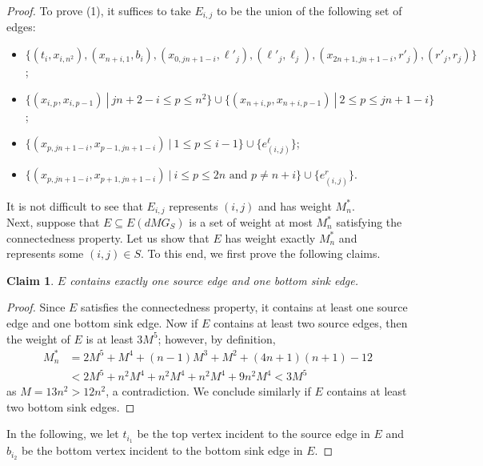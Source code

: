 \documentclass[a4paper,11pt]{article}
\theoremstyle{plain}
\newtheorem{claim}[theorem]{Claim}
\newtheorem{identification rule}{Identification Rule}
\theoremstyle{definition}
\theoremstyle{remark}
\newenvironment{claimproof}{\begin{proof}\renewcommand{\qedsymbol}{\claimqed}}{\end{proof}\renewcommand{\qedsymbol}{\plainqed}}
\let\plainqed\qedsymbol
\newcommand{\claimqed}{$\lrcorner$}
\begin{document}
\begin{proof}
To prove (1), it suffices to take $E_{i,j}$ to be the union of the following set of edges:
\begin{itemize}
\item $\{(t_i,x_{i,n^2}),(x_{n+i,1},b_i),(x_{0,jn+1-i},\ell'_j),(\ell'_j,\ell_j),(x_{2n+1,jn+1-i},r'_j),(r'_j,r_j)\}$;
\item $\{(x_{i,p},x_{i,p-1})~|~ jn+2-i\leq p \leq n^2\} \cup \{(x_{n+i,p},x_{n+i,p-1})~|~2 \leq p \leq jn+1-i\}$;
\item $\{(x_{p,jn+1-i},x_{p-1,jn+1-i})~|~ 1 \leq p \leq i-1\} \cup \{e^\ell_{(i,j)}\}$;
\item $\{(x_{p,jn+1-i},x_{p+1,jn+1-i})~|~i \leq p \leq 2n \text { and } p \neq n+i\} \cup \{e^r_{(i,j)}\}$.
\end{itemize}
It is not difficult to see that $E_{i,j}$ represents $(i,j)$ and has weight $M_n^*$.\\

Next, suppose that $E \subseteq E(dMG_S)$ is a set of weight at most $M_n^*$ satisfying the connectedness property. Let us show that $E$ has weight exactly $M_n^*$ and represents some $(i,j) \in S$. To this end, we first prove the following claims.

\begin{claim}
\label{clm:sourcesinkedges2}
$E$ contains exactly one source edge and one bottom sink edge.
\end{claim}

\begin{claimproof}
Since $E$ satisfies the connectedness property, it contains at least one source edge and one bottom sink edge. Now if $E$ contains at least two source edges, then the weight of $E$ is at least $3M^5$; however, by definition,
\begin{equation*}
\begin{split}
M_n^* &=  2M^5 + M^4 + (n-1)M^3 + M^2 + (4n+1)(n+1) - 12\\ 
& < 2M^5 + n^2M^4 + n^2M^4 + n^2M^4 + 9n^2M^4 < 3M^5
\end{split}
\end{equation*}
as $M = 13n^2 > 12n^2$, a contradiction. We conclude similarly if $E$ contains at least two bottom sink edges.
\end{claimproof}

In the following, we let $t_{i_1}$ be the top vertex incident to the source edge in $E$ and $b_{i_2}$ be the bottom vertex incident to the bottom sink edge in $E$. 


\end{proof}
\end{document}
